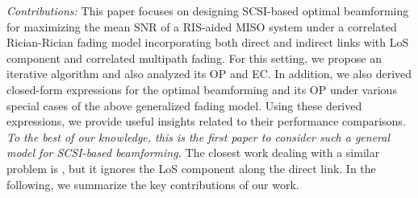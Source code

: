 \documentclass[journal,draftclsnofoot,onecolumn,12pt]{IEEEtran}
\begin{document}
{\em Contributions:} This paper focuses on designing SCSI-based optimal beamforming for maximizing the mean SNR of a RIS-aided MISO system under a correlated Rician-Rician fading model incorporating both direct and indirect links with LoS component and correlated multipath fading. For this setting, we propose an iterative algorithm and also analyzed its OP and EC. In addition, we also derived closed-form expressions for the optimal beamforming and its OP under various special cases of the above generalized fading model. Using these derived expressions, we provide useful insights related to their performance comparisons. {\em To the best of our knowledge, this is the first paper to consider such a general model for SCSI-based beamforming.} The closest work dealing with a similar problem is \cite{WangJinghe_CorrelatedFading_2021}, but it ignores the LoS component along the direct link. In the following, we summarize the key contributions of our work.
\end{document}
